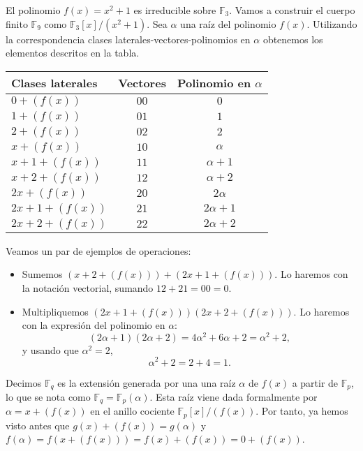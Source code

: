 \begin{example}
  El polinomio \(f(x) = x^2 + 1\) es irreducible sobre \(\mathbb F_3\).
  Vamos a construir el cuerpo finito \(\mathbb F_9\) como \(\mathbb F_3[x]/(x^2 + 1)\).
  Sea \(\alpha\) una raíz del polinomio \(f(x)\).
  Utilizando la correspondencia clases laterales-vectores-polinomios en \(\alpha\) obtenemos los elementos descritos en la tabla.
  \begin{table}[h]
    \centering
    \sffamily
    \begin{tabular}{lcc}
      \toprule
      Clases laterales & Vectores & Polinomio en \(\alpha\)\\
      \midrule
      \(0 + (f(x))\) & \(00\) & \(0\)\\
      \(1 + (f(x))\) & \(01\) & \(1\)\\
      \(2 + (f(x))\) & \(02\) & \(2\)\\
      \(x + (f(x))\) & \(10\) & \(\alpha\)\\
      \(x + 1 + (f(x))\) & \(11\) & \(\alpha + 1\)\\
      \(x + 2 + (f(x))\) & \(12\) & \(\alpha + 2\)\\
      \(2x + (f(x))\) & \(20\) & \(2\alpha\)\\
      \(2x + 1 + (f(x))\) & \(21\) & \(2\alpha + 1\)\\
      \(2x + 2 + (f(x))\) & \(22\) & \(2\alpha + 2\)\\
      \bottomrule
    \end{tabular}
  \end{table}

  Veamos un par de ejemplos de operaciones: \begin{itemize}
    \item Sumemos \((x + 2 + (f(x))) + (2x + 1 + (f(x)))\). Lo haremos con la notación vectorial, sumando \(12 + 21 = 00 = 0\).
    \item Multipliquemos \((2x + 1 + (f(x)))(2x + 2 + (f(x)))\). Lo haremos con la expresión del polinomio en \(\alpha\):
    \[
      (2\alpha + 1)(2\alpha + 2) = 4\alpha^2 + 6\alpha + 2 = \alpha^2 + 2,
    \]
    y usando que \(\alpha^2 = 2\), 
    \[
      \alpha^2 + 2 = 2 + 4 = 1.
    \]
  \end{itemize}
\end{example}

Decimos \(\mathbb F_q\) es la extensión generada por una una raíz \(\alpha\) de \(f(x)\) a partir de \(\mathbb F_p\), lo que se nota como \(\mathbb F_q = \mathbb F_p(\alpha)\).
Esta raíz viene dada formalmente por \(\alpha = x + (f(x))\) en el anillo cociente \(\mathbb F_p[x]/(f(x))\).
Por tanto, ya hemos visto antes que \(g(x) + (f(x)) = g(\alpha)\) y \(f(\alpha) = f(x + (f(x))) = f(x) + (f(x)) = 0 + (f(x))\).

